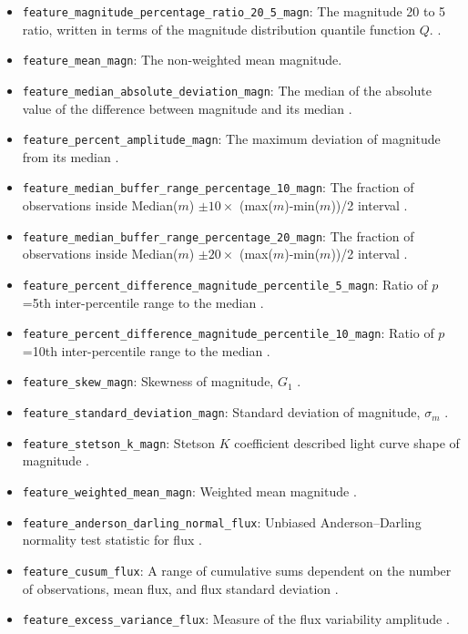 \documentclass[twocolumn]{aastex63}
\begin{document}
\begin{itemize}
    \item \texttt{feature\_magnitude\_percentage\_ratio\_20\_5\_magn}: The magnitude 20 to 5 ratio, written in terms of the magnitude distribution quantile function $Q$. \citep{D'Isanto2016}.
    \item \texttt{feature\_mean\_magn}: The non-weighted mean magnitude.
    \item \texttt{feature\_median\_absolute\_deviation\_magn}: The median of the absolute value of the difference between magnitude and its median \citep{D'Isanto2016}.
    \item \texttt{feature\_percent\_amplitude\_magn}: The maximum deviation of magnitude from its median \citep{D'Isanto2016}.
    \item \texttt{feature\_median\_buffer\_range\_percentage\_10\_magn}: The fraction of observations inside Median($m$) $\pm 10 \times$ (max($m$)-min($m$))/2 interval \citep{D'Isanto2016}.
    \item \texttt{feature\_median\_buffer\_range\_percentage\_20\_magn}: The fraction of observations inside Median($m$) $\pm 20 \times$ (max($m$)-min($m$))/2 interval \citep{D'Isanto2016}.
    \item \texttt{feature\_percent\_difference\_magnitude\_percentile\_5\_magn}: Ratio of $p$=5th inter-percentile range to the median \citep{Malanchev2021}.
    \item \texttt{feature\_percent\_difference\_magnitude\_percentile\_10\_magn}: Ratio of $p$=10th inter-percentile range to the median \citep{Malanchev2021}.
    \item \texttt{feature\_skew\_magn}: Skewness of magnitude, $G_{1}$ \citep{Malanchev2021}.
    \item \texttt{feature\_standard\_deviation\_magn}: 	Standard deviation of magnitude, $\sigma_{m}$ \citep{Malanchev2021}.
    \item \texttt{feature\_stetson\_k\_magn}: Stetson $K$ coefficient described light curve shape of magnitude \citep{Stetson1996}.
    \item \texttt{feature\_weighted\_mean\_magn}: Weighted mean magnitude \citep{Malanchev2021}.
    \item \texttt{feature\_anderson\_darling\_normal\_flux}: Unbiased Anderson–Darling normality test statistic for flux \citep{Malanchev2021}.
    \item \texttt{feature\_cusum\_flux}: A range of cumulative sums dependent on the number of observations, mean flux, and flux standard deviation \citep{Kim2014}.
    \item \texttt{feature\_excess\_variance\_flux}: Measure of the flux variability amplitude \citep{Sanchez2017}.

\end{itemize}
\end{document}
